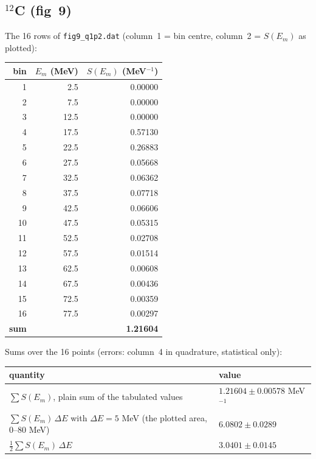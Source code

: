 \documentclass[11pt]{article}
\begin{document}
\subsection{\texorpdfstring{$^{12}$C}{C12} (fig~9)}

The 16 rows of \texttt{fig9\_q1p2.dat} (column~1 = bin centre, column~2 =
$S(E_m)$ as plotted):

\begin{center}
\begin{tabular}{rrr}
\toprule
bin & $E_m$ (MeV) & $S(E_m)$ (MeV$^{-1}$) \\
\midrule
1 & 2.5 & 0.00000 \\
2 & 7.5 & 0.00000 \\
3 & 12.5 & 0.00000 \\
4 & 17.5 & 0.57130 \\
5 & 22.5 & 0.26883 \\
6 & 27.5 & 0.05668 \\
7 & 32.5 & 0.06362 \\
8 & 37.5 & 0.07718 \\
9 & 42.5 & 0.06606 \\
10 & 47.5 & 0.05315 \\
11 & 52.5 & 0.02708 \\
12 & 57.5 & 0.01514 \\
13 & 62.5 & 0.00608 \\
14 & 67.5 & 0.00436 \\
15 & 72.5 & 0.00359 \\
16 & 77.5 & 0.00297 \\
\midrule
\textbf{sum} & & \textbf{1.21604} \\
\bottomrule
\end{tabular}
\end{center}

Sums over the 16 points (errors: column~4 in quadrature, statistical only):

\begin{center}
\begin{tabular}{ll}
\toprule
quantity & value \\
\midrule
$\sum S(E_m)$, plain sum of the tabulated values & $\mathbf{1.21604 \pm 0.00578}$ MeV$^{-1}$ \\
$\sum S(E_m)\,\Delta E$ with $\Delta E = 5$ MeV (the plotted area, 0--80 MeV) & $\mathbf{6.0802 \pm 0.0289}$ \\
$\tfrac12 \sum S(E_m)\,\Delta E$ & $3.0401 \pm 0.0145$ \\
\bottomrule
\end{tabular}
\end{center}
\end{document}
